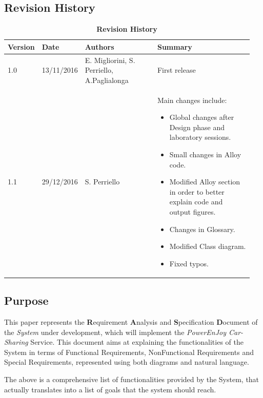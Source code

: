 \subsection{Revision History}
\begin{longtable}{|p{0.1\linewidth}|p{0.15\linewidth}| p{0.3\linewidth} | p{0.4\linewidth} |}
	\caption{\textbf{Revision History}}
	\label{tab:rev_history} \\ \hline

	\textbf{Version} & \textbf{Date} & Authors & \textbf{Summary} \\ \hline
	1.0 & 13/11/2016 & E. Migliorini, S. Perriello, A.Paglialonga & First release\\ \hline
	1.1 & 29/12/2016 & S. Perriello & 
	Main changes include:
	\begin{itemize}
	\item Global changes after Design phase and laboratory sessions.
	\item Small changes in Alloy code.
	\item Modified Alloy section in order to better explain code and output figures.
	\item Changes in Glossary.
	\item Modified Class diagram.
	\item Fixed typos.
	\end{itemize}\\ \hline
\end{longtable}

\subsection{Purpose}
This paper represents the \textbf{R}equirement \textbf{A}nalysis and \textbf{S}pecification \textbf{D}ocument of the \textit{System} under development, which will implement the \emph{PowerEnJoy Car-Sharing} Service. This document aims at explaining the functionalities of the System in terms of Functional Requirements, NonFunctional Requirements and Special Requirements, represented using both diagrams and natural language.

The above is a comprehensive list of functionalities provided by the System, that actually translates into a list of goals that the system should reach.

